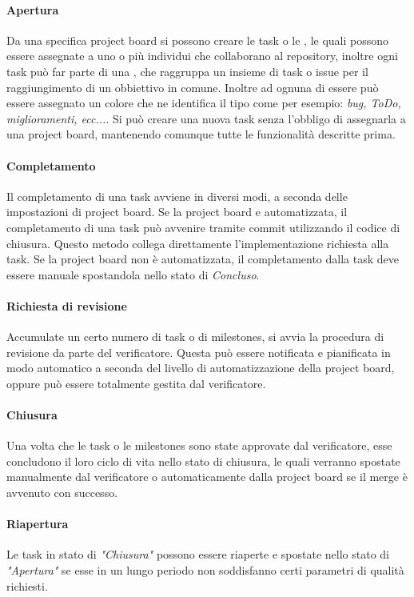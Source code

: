 \paragraph{Apertura ~\\}
	Da una specifica project board si possono creare le task o le , le quali possono essere assegnate a uno o più individui che collaborano al repository, inoltre ogni task
	può far parte di una , che raggruppa un insieme di task o issue per il raggiungimento di un obbiettivo in comune. 
	Inoltre ad ognuna di essere può essere assegnato un colore che ne identifica il tipo come per esempio: \textit{bug, ToDo, miglioramenti, ecc...}. 
	Si può creare una nuova task senza l'obbligo di assegnarla a una project board, mantenendo comunque tutte le funzionalità descritte prima. 

\paragraph{Completamento ~\\}
	Il completamento di una task avviene in diversi modi, a seconda delle impostazioni di project board. 
	Se la project board e automatizzata, il completamento di una task può avvenire tramite commit utilizzando il codice di chiusura. 
	Questo metodo collega direttamente l'implementazione richiesta alla task. 
	Se la project board non è automatizzata, il completamento dalla task deve essere manuale spostandola nello stato di \textit{Concluso}. 
	
\paragraph{Richiesta di revisione ~\\}
	Accumulate un certo numero di task o di milestones, si avvia la procedura di revisione da parte del verificatore. Questa può essere notificata e pianificata in modo automatico
	a seconda del livello di automatizzazione della project board, oppure può essere totalmente gestita dal verificatore. 
	
	\paragraph{Chiusura ~\\}
	Una volta che le task o le milestones sono state approvate dal verificatore, esse concludono il loro ciclo di vita nello stato di chiusura, le quali verranno spostate manualmente dal 
	verificatore o automaticamente dalla project board se il merge è avvenuto con successo. 
	
\paragraph{Riapertura ~\\}
	Le task in stato di \textit{"Chiusura"} possono essere riaperte e spostate nello stato di \textit{"Apertura"} se esse in un lungo periodo non soddisfanno certi parametri di qualità
	richiesti. 
	